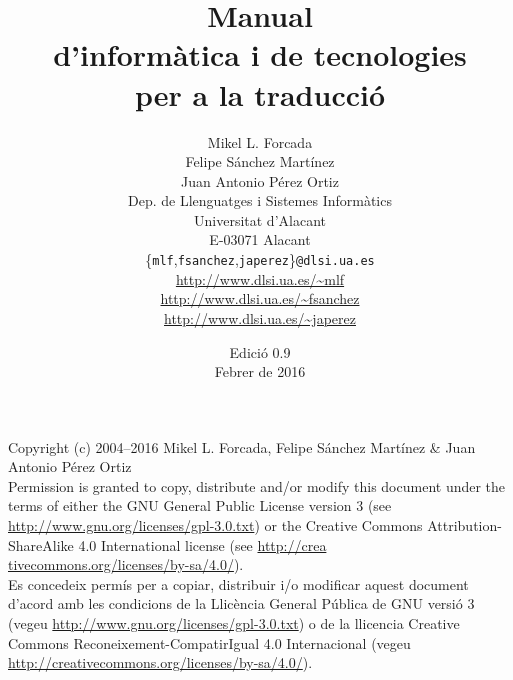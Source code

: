\documentclass[11pt,a4paper]{book}
\begin{document}
\frontmatter


\title{\bf Manual \\ d'informàtica i de tecnologies\\ per a la traducció}

\author{Mikel L. Forcada\\Felipe Sánchez Martínez\\Juan Antonio Pérez Ortiz\\[2ex]
Dep. de Llenguatges i Sistemes Informàtics\\
Universitat d'Alacant\\
E-03071 Alacant\\[2ex]
\{\texttt{mlf},\texttt{fsanchez},\texttt{japerez}\}\texttt{@dlsi.ua.es} \\[2ex]
\url{http://www.dlsi.ua.es/~mlf} \\
\url{http://www.dlsi.ua.es/~fsanchez} \\
\url{http://www.dlsi.ua.es/~japerez}
}
\date{Edició 0.9\\ Febrer de 2016}
\maketitle
\newpage
\noindent Copyright (c) 2004--2016 Mikel L. Forcada, Felipe Sánchez Martínez \& Juan Antonio Pérez Ortiz \\[0.3cm]

\noindent Permission is granted to copy, distribute and/or modify this
document under the terms of either the GNU General Public License
version 3 (see \url{http://www.gnu.org/licenses/gpl-3.0.txt}) or the
Creative Commons Attribution-ShareAlike 4.0 International
license (see \url{http://crea} \url{tivecommons.org/licenses/by-sa/4.0/}). \\[0.3cm]

\noindent Es concedeix permís per a copiar, distribuir i/o modificar
aquest document d'acord amb les condicions de la Llicència General
Pública de GNU versió 3 (vegeu
\url{http://www.gnu.org/licenses/gpl-3.0.txt}) o de la llicencia
Creative Commons Reconeixement-CompatirIgual 4.0 Internacional (vegeu
\url{http://creativecommons.org/licenses/by-sa/4.0/}).


\maketitle
\end{document}

